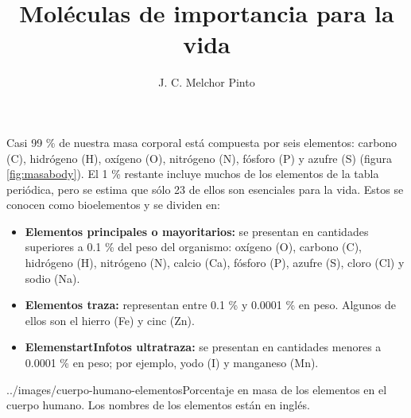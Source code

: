 \documentclass[12pt,addpoints,answers]{guia}
\title{Moléculas de importancia para la vida}
\author{J. C. Melchor Pinto}
\begin{document}
\pagestyle{headandfoot}

\INFO

\begin{startInfo}
    {
        Casi 99 \% de nuestra masa corporal está compuesta por seis elementos:
        carbono (C), hidrógeno (H), oxígeno (O), nitrógeno (N), fósforo
        (P) y azufre (S) (figura \ref{fig:masabody}). El 1  \% restante incluye muchos
        de los elementos de la tabla periódica, pero se estima que
        sólo 23 de ellos son esenciales para la vida. Estos se conocen
        como bioelementos y se dividen en:
        \begin{itemize}
            \item \textbf{Elementos principales o mayoritarios:} se presentan en cantidades superiores a 0.1 \% del peso del organismo: oxígeno (O),
                  carbono (C), hidrógeno (H), nitrógeno (N), calcio (Ca), fósforo
                  (P), azufre (S), cloro (Cl) y sodio (Na).
            \item \textbf{Elementos traza:} representan entre 0.1 \% y 0.0001 \% en peso.
                  Algunos de ellos son el hierro (Fe) y cinc (Zn).
            \item \textbf{ElemenstartInfotos ultratraza:} se presentan en cantidades menores a
                  0.0001 \% en peso; por ejemplo, yodo (I) y manganeso (Mn).
        \end{itemize}
    }{../images/cuerpo-humano-elementos}{Porcentaje en masa de los elementos
        en el cuerpo humano. Los nombres de los elementos están en inglés.}
\end{startInfo}
\end{document}
